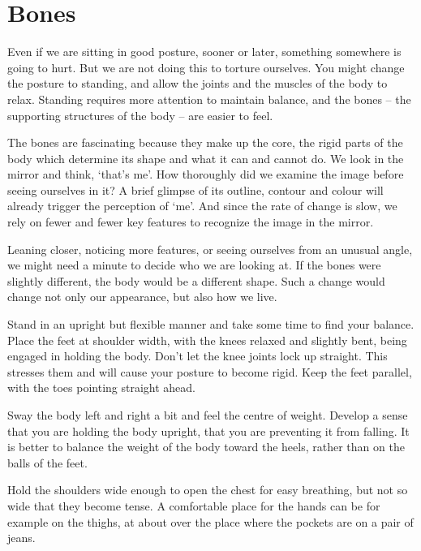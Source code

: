 \chapter{Bones}


Even if we are sitting in good posture, sooner or later, something
somewhere is going to hurt. But we are not doing this to torture
ourselves. You might change the posture to standing, and allow the
joints and the muscles of the body to relax. Standing requires more
attention to maintain balance, and the bones -- the supporting
structures of the body -- are easier to feel.

The bones are fascinating because they make up the core, the rigid parts
of the body which determine its shape and what it can and cannot do. We
look in the mirror and think, `that's me'. How thoroughly did we examine
the image before seeing ourselves in it? A brief glimpse of its outline,
contour and colour will already trigger the perception of `me'. And
since the rate of change is slow, we rely on fewer and fewer key
features to recognize the image in the mirror.

Leaning closer, noticing more features, or seeing ourselves from an
unusual angle, we might need a minute to decide who we are looking at.
If the bones were slightly different, the body would be a different
shape. Such a change would change not only our appearance, but also how
we live.


Stand in an upright but flexible manner and take some time to find your
balance. Place the feet at shoulder width, with the knees relaxed and
slightly bent, being engaged in holding the body. Don't let the knee
joints lock up straight. This stresses them and will cause your posture
to become rigid. Keep the feet parallel, with the toes pointing straight
ahead.

Sway the body left and right a bit and feel the centre of weight.
Develop a sense that you are holding the body upright, that you are
preventing it from falling. It is better to balance the weight of the
body toward the heels, rather than on the balls of the feet.

Hold the shoulders wide enough to open the chest for easy breathing, but
not so wide that they become tense. A comfortable place for the hands
can be for example on the thighs, at about over the place where the
pockets are on a pair of jeans.

